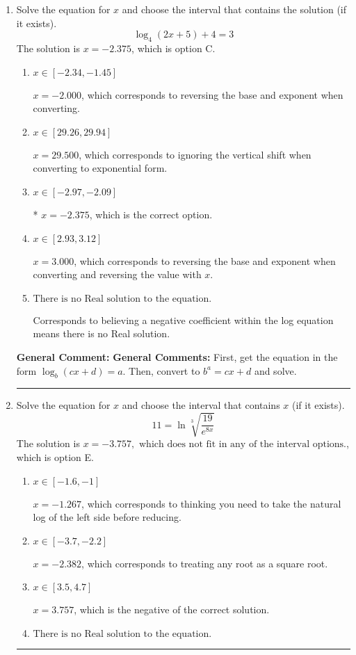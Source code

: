 \documentclass{extbook}[14pt]
\newcommand{\litem}[1]{\item #1

\rule{\textwidth}{0.4pt}}
\begin{document}
\begin{enumerate}\litem{
Solve the equation for $x$ and choose the interval that contains the solution (if it exists).
\[ \log_{4}{(2x+5)}+4 = 3 \]The solution is \( x = -2.375 \), which is option C.\begin{enumerate}[label=\Alph*.]
\item \( x \in [-2.34, -1.45] \)

$x = -2.000$, which corresponds to reversing the base and exponent when converting.
\item \( x \in [29.26, 29.94] \)

$x = 29.500$, which corresponds to ignoring the vertical shift when converting to exponential form.
\item \( x \in [-2.97, -2.09] \)

* $x = -2.375$, which is the correct option.
\item \( x \in [2.93, 3.12] \)

$x = 3.000$, which corresponds to reversing the base and exponent when converting and reversing the value with $x$.
\item \( \text{There is no Real solution to the equation.} \)

Corresponds to believing a negative coefficient within the log equation means there is no Real solution.
\end{enumerate}

\textbf{General Comment:} \textbf{General Comments:} First, get the equation in the form $\log_b{(cx+d)} = a$. Then, convert to $b^a = cx+d$ and solve.
}
\litem{
 Solve the equation for $x$ and choose the interval that contains $x$ (if it exists).
\[  11 = \ln{\sqrt[3]{\frac{19}{e^{8x}}}} \]The solution is \( x = -3.757, \text{ which does not fit in any of the interval options.} \), which is option E.\begin{enumerate}[label=\Alph*.]
\item \( x \in [-1.6, -1] \)

$x = -1.267$, which corresponds to thinking you need to take the natural log of the left side before reducing.
\item \( x \in [-3.7, -2.2] \)

$x = -2.382$, which corresponds to treating any root as a square root.
\item \( x \in [3.5, 4.7] \)

$x = 3.757$, which is the negative of the correct solution.
\item \( \text{There is no Real solution to the equation.} \)


\end{enumerate}}
\end{enumerate}
\end{document}
